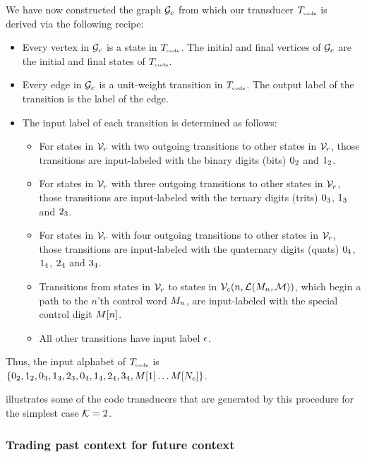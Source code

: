 \documentclass[english]{article}
\begin{document}
We have now constructed the graph ${\cal G}_c$ from which our transducer $T_{\mbox{\tiny code}}$
is derived via the following recipe:
\begin{itemize}
\item Every vertex in ${\cal G}_c$ is a state in $T_{\mbox{\tiny code}}$.
The initial and final vertices of ${\cal G}_c$ are the initial and final states of $T_{\mbox{\tiny code}}$.
\item Every edge in ${\cal G}_c$ is a unit-weight transition in $T_{\mbox{\tiny code}}$.
The output label of the transition is the label of the edge.
\item The input label of each transition is determined as follows:
\begin{itemize}
\item For states in ${\cal V}_r$ with two outgoing transitions to other states in ${\cal V}_r$, those transitions are input-labeled with the binary digits (bits) $0_2$ and $1_2$.
\item For states in ${\cal V}_r$ with three outgoing transitions to other states in ${\cal V}_r$, those transitions are input-labeled with the ternary digits (trits) $0_3$, $1_3$ and $2_3$.
\item For states in ${\cal V}_r$ with four outgoing transitions to other states in ${\cal V}_r$, those transitions are input-labeled with the quaternary digits (quats) $0_4$, $1_4$, $2_4$ and $3_4$.
\item Transitions from states in ${\cal V}_r$ to states in ${\cal V}_c(n,{\cal L}(M_n,{\cal M}))$,
which begin a path to the $n$'th control word $M_n$,
are input-labeled with the special control digit $M[{n}]$.
\item All other transitions have input label $\epsilon$.
\end{itemize}
\end{itemize}

Thus, the input alphabet of $T_{\mbox{\tiny code}}$
is $\{ 0_2, 1_2,
       0_3, 1_3, 2_3,
       0_4, 1_4, 2_4, 3_4,
       M[{1}] \ldots M[{N_c}] \}$.

 illustrates some of the code transducers that are generated by this procedure for the simplest case ${\cal K}=2$.
       
\subsubsection{Trading past context for future context}
\end{document}
